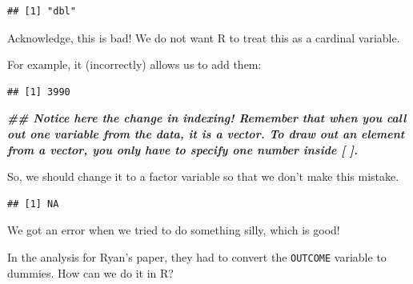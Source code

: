 \documentclass[
]{article}
\newenvironment{Shaded}{\begin{snugshade}}{\end{snugshade}}
\newcommand{\DecValTok}[1]{\textcolor[rgb]{0.00,0.00,0.81}{#1}}
\newcommand{\DocumentationTok}[1]{\textcolor[rgb]{0.56,0.35,0.01}{\textbf{\textit{#1}}}}
\newcommand{\FunctionTok}[1]{\textcolor[rgb]{0.00,0.00,0.00}{#1}}
\newcommand{\NormalTok}[1]{#1}
\newcommand{\OtherTok}[1]{\textcolor[rgb]{0.56,0.35,0.01}{#1}}
\newcommand{\SpecialCharTok}[1]{\textcolor[rgb]{0.00,0.00,0.00}{#1}}
\begin{document}
\begin{verbatim}
## [1] "dbl"
\end{verbatim}

Acknowledge, this is bad! We do not want R to treat this as a cardinal
variable.

For example, it (incorrectly) allows us to add them:

\begin{Shaded}
\end{Shaded}

\begin{verbatim}
## [1] 3990
\end{verbatim}

\begin{Shaded}
\begin{Highlighting}[]
\DocumentationTok{\#\# Notice here the change in indexing! Remember that when you call out one variable from the data, it is a vector. To draw out an element from a vector, you only have to specify one number inside [ ].}
\end{Highlighting}
\end{Shaded}

So, we should change it to a factor variable so that we don't make this
mistake.

\begin{Shaded}
\end{Shaded}

\begin{verbatim}
## [1] NA
\end{verbatim}

We got an error when we tried to do something silly, which is good!

In the analysis for Ryan's paper, they had to convert the
\texttt{OUTCOME} variable to dummies. How can we do it in R?
\end{document}
